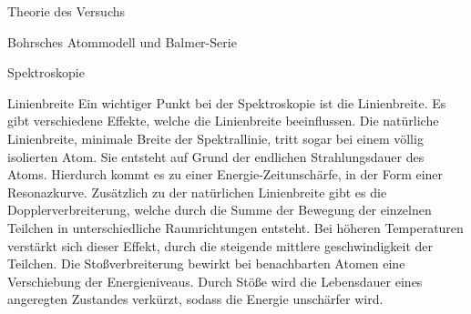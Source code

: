 \documentclass[pdftex, a4paper,11pt, twoside, ngerman]{report}
\begin{document}
\begin{chapter}{Theorie des Versuchs}
\begin{section}{Bohrsches Atommodell und Balmer-Serie}
\begin{subsection}{Spektroskopie}
	\begin{subsubsection}{Linienbreite}
	  Ein wichtiger Punkt bei der Spektroskopie ist die Linienbreite. Es gibt verschiedene Effekte, welche die Linienbreite beeinflussen. Die natürliche Linienbreite, minimale Breite der Spektrallinie, tritt sogar bei einem völlig isolierten Atom. Sie entsteht auf Grund der endlichen Strahlungsdauer des Atoms. Hierdurch kommt es zu einer Energie-Zeitunschärfe, in der Form einer Resonazkurve. Zusätzlich zu der natürlichen Linienbreite gibt es die Dopplerverbreiterung, welche durch die Summe  der Bewegung der einzelnen Teilchen in unterschiedliche Raumrichtungen entsteht. Bei höheren Temperaturen verstärkt sich dieser Effekt, durch die steigende mittlere geschwindigkeit der Teilchen. Die Stoßverbreiterung bewirkt bei benachbarten Atomen eine Verschiebung der Energieniveaus. Durch Stöße wird die Lebensdauer eines angeregten Zustandes verkürzt, sodass die Energie unschärfer wird.
	
	
	\end{subsubsection}

      \end{subsection}
      
    \end{section}

  \end{chapter}
	  
	  
	  
\end{document}
